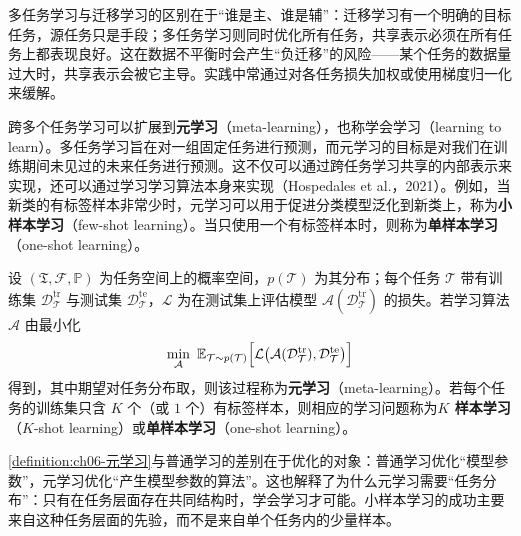 \documentclass[../../main.tex]{subfiles}
\begin{document}
\begin{remark}多任务学习与迁移学习的区别在于“谁是主、谁是辅”：迁移学习有一个明确的目标任务，源任务只是手段；多任务学习则同时优化所有任务，共享表示必须在所有任务上都表现良好。这在数据不平衡时会产生“负迁移”的风险——某个任务的数据量过大时，共享表示会被它主导。实践中常通过对各任务损失加权或使用梯度归一化来缓解。
\end{remark}

跨多个任务学习可以扩展到\textbf{元学习}（meta-learning），也称学会学习（learning to learn）。多任务学习旨在对一组固定任务进行预测，而元学习的目标是对我们在训练期间未见过的未来任务进行预测。这不仅可以通过跨任务学习共享的内部表示来实现，还可以通过学习学习算法本身来实现（Hospedales et al.，2021）。例如，当新类的有标签样本非常少时，元学习可以用于促进分类模型泛化到新类上，称为\textbf{小样本学习}（few-shot learning）。当只使用一个有标签样本时，则称为\textbf{单样本学习}（one-shot learning）。

\begin{definition}[元学习]\label{definition:ch06-元学习}
设 $(\mathfrak{T},\mathcal{F},\mathbb{P})$ 为任务空间上的概率空间，$p(\mathcal{T})$ 为其分布；每个任务 $\mathcal{T}$ 带有训练集 $\mathcal{D}_{\mathcal{T}}^{\mathrm{tr}}$ 与测试集 $\mathcal{D}_{\mathcal{T}}^{\mathrm{te}}$，$\mathcal{L}$ 为在测试集上评估模型 $\mathcal{A}(\mathcal{D}_{\mathcal{T}}^{\mathrm{tr}})$ 的损失。若学习算法 $\mathcal{A}$ 由最小化
\begin{align}
\min_{\mathcal{A}}\ \mathbb{E}_{\mathcal{T}\sim p(\mathcal{T})}\Bigl[\mathcal{L}\bigl(\mathcal{A}(\mathcal{D}_{\mathcal{T}}^{\mathrm{tr}}),\mathcal{D}_{\mathcal{T}}^{\mathrm{te}}\bigr)\Bigr]
\label{align:ch06-元学习}
\end{align}
得到，其中期望对任务分布取，则该过程称为\textbf{元学习}（meta-learning）。若每个任务的训练集只含 $K$ 个（或 $1$ 个）有标签样本，则相应的学习问题称为\textbf{$K$ 样本学习}（$K$-shot learning）或\textbf{单样本学习}（one-shot learning）。
\end{definition}

\begin{remark}\cref{definition:ch06-元学习}与普通学习的差别在于优化的对象：普通学习优化“模型参数”，元学习优化“产生模型参数的算法”。这也解释了为什么元学习需要“任务分布”：只有在任务层面存在共同结构时，学会学习才可能。小样本学习的成功主要来自这种任务层面的先验，而不是来自单个任务内的少量样本。
\end{remark}
\end{document}
